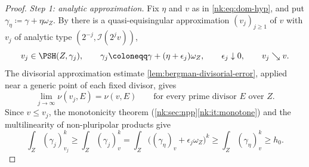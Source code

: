 \begin{proof}
\emph{Step 1: analytic approximation.}
Fix $\eta$ and $v$ as in \eqref{nk:eq:dom-hyp}, and put
$\gamma_\eta\coloneqq \gamma+\eta\omega_Z$. By \cite[Theorem~1.6.2]{SGPT}
there is a quasi-equisingular approximation $(v_j)_{j\ge1}$ of $v$
with $v_j$ of analytic type $(2^{-j},\mathcal I(2^jv))$,
\[
  v_j\in\PSH(Z,\gamma_j),\qquad
  \gamma_j\coloneqq \gamma+(\eta+\epsilon_j)\omega_Z,\qquad
  \epsilon_j\downarrow0,\qquad v_j\searrow v.
\]
The divisorial approximation estimate \cref{lem:bergman-divisorial-error},
applied near a generic point of each fixed divisor, gives
\begin{equation}\label{nk:eq:dom-lelong-conv}
  \lim_{j\to\infty}\nu(v_j,E)=\nu(v,E)
  \qquad\text{for every prime divisor $E$ over $Z$}.
\end{equation}
Since $v\le v_j$, the monotonicity theorem
(\cref{nk:sec:npp}\ref{nk:it:monotone}) and the multilinearity of non-pluripolar
products give
\begin{equation}\label{nk:eq:dom-mass}
  \int_Z(\gamma_j)_{v_j}^k
  \ge\int_Z(\gamma_j)_{v}^k
  =\int_Z\bigl((\gamma_\eta)_v+\epsilon_j\omega_Z\bigr)^k
  \ge\int_Z(\gamma_\eta)_v^k\ge h_0.
\end{equation}


\end{proof}
